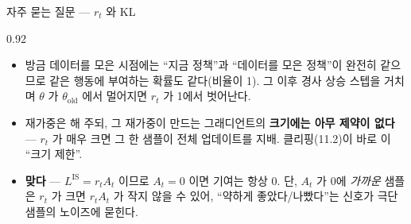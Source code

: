 \begin{frame}{자주 묻는 질문 — $r_t$ 와 KL}
\begin{center}\begin{varwidth}{0.92\textwidth}
  \small
  \begin{itemize}
    \item {} 방금 데이터를 모은 시점에는 ``지금 정책''과
      ``데이터를 모은 정책''이 완전히 같으므로 같은 행동에 부여하는
      확률도 같다(비율이 1). 그 이후 경사 상승 스텝을 거치며
      $\theta$ 가 $\theta_{\mathrm{old}}$ 에서 멀어지면 $r_t$ 가
      1에서 벗어난다.
    \item {} 재가중은
      해 주되, 그 재가중이 만드는 그래디언트의 \textbf{크기에는
      아무 제약이 없다} — $r_t$ 가 매우 크면 그 한 샘플이 전체
      업데이트를 지배. 클리핑(11.2)이 바로 이 ``크기 제한''.
    \item {}
      \textbf{맞다} — $L^{\mathrm{IS}}=r_tA_t$ 이므로 $A_t=0$ 이면
      기여는 항상 0. 단, $A_t$ 가 0에 \textit{가까운} 샘플은
      $r_t$ 가 크면 $r_tA_t$ 가 작지 않을 수 있어,
      ``약하게 좋았다/나빴다''는 신호가 극단 샘플의 노이즈에
      묻힌다.
  \end{itemize}
\end{varwidth}\end{center}
\end{frame}
